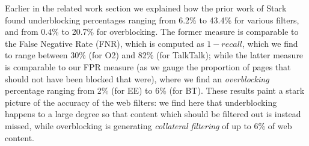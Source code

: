 \documentclass{bmcart}
\begin{document}
Earlier in the related work section we explained how the prior work of Stark \cite{stark2007effectiveness} found underblocking percentages ranging from 6.2\% to 43.4\%  for various filters, and from 0.4\% to 20.7\% for overblocking.
The former measure is comparable to the False Negative Rate (FNR), which is computed as $1 - recall$, which we find to range between 30\% (for O2) and 82\% (for TalkTalk); while the latter measure is comparable to our FPR measure (as we gauge the proportion of pages that should not have been blocked that were), where we find an \textit{overblocking} percentage ranging from 2\% (for EE) to 6\% (for BT).
These results paint a stark picture of the accuracy of the web filters: we find here that underblocking happens to a large degree so that content which should be filtered out is instead missed, while overblocking is generating \textit{collateral filtering} of up to 6\% of web content.





\end{document}
